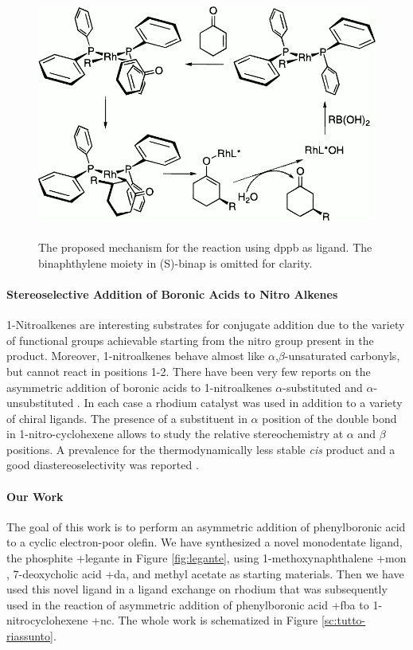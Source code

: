 \begin{figure}
 \centering
 \includegraphics[width=.6\textwidth]{sc/1998-OH.png}
  \caption{\\ The proposed mechanism for the reaction using dppb as ligand. The bi\-naphthylene moiety in (S)-binap is omitted for clarity.
\label{sc:1998-OH}}
\end{figure}
\else
\fignoeps
\fi

\paragraph{Stereo\-selective Addition of Boronic Acids to Nitro Alkenes}
1-Nitro\-alkenes are interesting substrates for conjugate addition due to the variety of functional groups achievable starting from the nitro group present in the product. Moreover, 1-nitro\-alkenes behave almost like $\alpha$,$\beta$-un\-saturated carbonyls, but cannot react in positions 1-2. There have been very few reports on the asymmetric addition of boronic acids to 1-nitro\-alkenes $\alpha$-substituted \cite{Hayashi2000} and $\alpha$-unsubstituted \cite{Wang2010, Xue2012}. In each case a rhodium catalyst was used in addition to a variety of chiral ligands. The presence of a substituent in $\alpha$ position of the double bond in 1-nitro-cyclo\-hexene allows to study the relative stereo\-chemistry at $\alpha$ and $\beta$ positions. A prevalence for the thermo\-dynamically less stable \emph{cis} product and a good diastereo\-selectivity was reported \cite{Hayashi2000}. 

\paragraph{Our Work} The goal of this work is to perform an asymmetric addition of phenylboronic acid to a cyclic electron-poor olefin. We have synthesized a novel monodentate ligand, the phosphite \cmpd+{legante} in 
Figure \ref{fig:legante}, using 1-methoxy\-naphthalene \cmpd+{mon}%
, 7-deoxy\-cholic acid \cmpd+{da},  and methyl acetate as starting materials. Then we have used this novel ligand in a ligand exchange on rhodium 
that was subsequently used in the reaction of asymmetric addition of phenylboronic acid \cmpd+{fba} to 1-nitro\-cyclo\-hexene \cmpd+{nc}. The whole work is schematized in Figure \ref{sc:tutto-riassunto}. %



